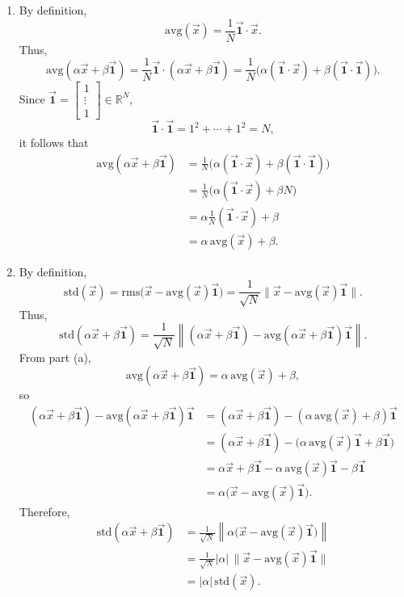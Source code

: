 \documentclass[10pt]{extarticle}
\begin{document}
\begin{enumerate}[label=(\alph*)]
\item By definition,
\[
\mathrm{avg}(\vec{x})=\frac{1}{N}\vec{\mathbf{1}}\cdot\vec{x}.
\]
Thus,
\[
\mathrm{avg}(\alpha\vec{x}+\beta\vec{\mathbf{1}})
=\frac{1}{N}\vec{\mathbf{1}}\cdot(\alpha\vec{x}+\beta\vec{\mathbf{1}})
=\frac{1}{N}\big(\alpha(\vec{\mathbf{1}}\cdot\vec{x})+\beta(\vec{\mathbf{1}}\cdot\vec{\mathbf{1}})\big).
\]
Since $\vec{\mathbf{1}}=\begin{bmatrix}1\\ \vdots\\ 1\end{bmatrix}\in\mathbb{R}^N$,
\[
\vec{\mathbf{1}}\cdot\vec{\mathbf{1}}=1^2+\cdots+1^2=N,
\]
it follows that
\begin{align*}
\mathrm{avg}(\alpha\vec{x}+\beta\vec{\mathbf{1}})
&=\frac{1}{N}\big(\alpha(\vec{\mathbf{1}}\cdot\vec{x})+\beta(\vec{\mathbf{1}}\cdot\vec{\mathbf{1}})\big)\\
&=\frac{1}{N}\big(\alpha(\vec{\mathbf{1}}\cdot\vec{x})+\beta N\big)\\
&=\alpha\frac{1}{N}(\vec{\mathbf{1}}\cdot\vec{x})+\beta\\
&=\alpha\,\mathrm{avg}(\vec{x})+\beta.
\end{align*}
\item By definition,
\[
\mathrm{std}(\vec{x})=\mathrm{rms}\big(\vec{x}-\mathrm{avg}(\vec{x})\vec{\mathbf{1}}\big)
=\frac{1}{\sqrt{N}}\big\|\vec{x}-\mathrm{avg}(\vec{x})\vec{\mathbf{1}}\big\|.
\]
Thus,
\[
\mathrm{std}(\alpha\vec{x}+\beta\vec{\mathbf{1}})
=\frac{1}{\sqrt{N}}\left\|(\alpha\vec{x}+\beta\vec{\mathbf{1}})-\mathrm{avg}(\alpha\vec{x}+\beta\vec{\mathbf{1}})\vec{\mathbf{1}}\right\|.
\]
From part (a),
\[
\mathrm{avg}(\alpha\vec{x}+\beta\vec{\mathbf{1}})=\alpha\,\mathrm{avg}(\vec{x})+\beta,
\]
so
\begin{align*}
(\alpha\vec{x}+\beta\vec{\mathbf{1}})-\mathrm{avg}(\alpha\vec{x}+\beta\vec{\mathbf{1}})\vec{\mathbf{1}}
&=(\alpha\vec{x}+\beta\vec{\mathbf{1}})-(\alpha\,\mathrm{avg}(\vec{x})+\beta)\vec{\mathbf{1}}\\
&=(\alpha\vec{x}+\beta\vec{\mathbf{1}})-\big(\alpha\,\mathrm{avg}(\vec{x})\vec{\mathbf{1}}+\beta\vec{\mathbf{1}}\big)\\
&=\alpha\vec{x}+\beta\vec{\mathbf{1}}-\alpha\,\mathrm{avg}(\vec{x})\vec{\mathbf{1}}-\beta\vec{\mathbf{1}}\\
&=\alpha\big(\vec{x}-\mathrm{avg}(\vec{x})\vec{\mathbf{1}}\big).
\end{align*}
Therefore,
\begin{align*}
\mathrm{std}(\alpha\vec{x}+\beta\vec{\mathbf{1}})
&=\frac{1}{\sqrt{N}}\left\|\alpha\big(\vec{x}-\mathrm{avg}(\vec{x})\vec{\mathbf{1}}\big)\right\|\\
&=\frac{1}{\sqrt{N}}|\alpha|\,\big\|\vec{x}-\mathrm{avg}(\vec{x})\vec{\mathbf{1}}\big\|\\
&=|\alpha|\,\mathrm{std}(\vec{x}).
\end{align*}
\end{enumerate}
\end{document}
